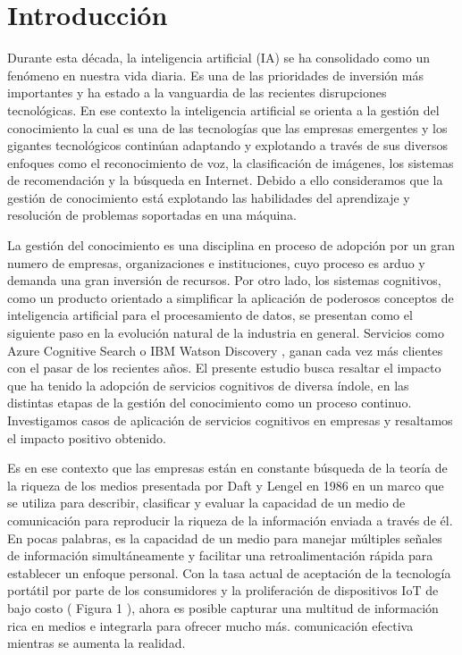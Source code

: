 \section{Introducción}

Durante esta década, la inteligencia artificial (IA) se ha consolidado como un fenómeno en nuestra vida diaria. Es una de las prioridades de inversión más importantes y ha estado a la vanguardia de las recientes disrupciones tecnológicas. En ese contexto la inteligencia artificial se orienta a la gestión del conocimiento la cual es una de las tecnologías que las empresas emergentes y los gigantes tecnológicos continúan adaptando y explotando a través de sus diversos enfoques como el reconocimiento de voz, la clasificación de imágenes, los sistemas de recomendación y la búsqueda en Internet. Debido a ello consideramos que la gestión de conocimiento está explotando las habilidades del aprendizaje y resolución de problemas soportadas en una máquina.

La gestión del conocimiento es una disciplina en proceso de adopción por un gran numero de empresas, organizaciones e instituciones, cuyo proceso es arduo y demanda una gran inversión de recursos. Por otro lado, los sistemas cognitivos, como un producto orientado a simplificar la aplicación de poderosos conceptos de inteligencia artificial para el procesamiento de datos, se presentan como el siguiente paso en la evolución natural de la industria en general. Servicios como Azure Cognitive Search o IBM Watson Discovery \cite{Tadejko2020}, ganan cada vez más clientes con el pasar de los recientes años. El presente estudio busca resaltar el impacto que ha tenido la adopción de servicios cognitivos de diversa índole, en las distintas etapas de la gestión del conocimiento como un proceso continuo. Investigamos casos de aplicación de servicios cognitivos en empresas y resaltamos el impacto positivo obtenido.

Es en ese contexto que las empresas están en constante búsqueda de la teoría de la riqueza de los medios presentada por Daft y Lengel en 1986 en un marco que se utiliza para describir, clasificar y evaluar la capacidad de un medio de comunicación para reproducir la riqueza de la información enviada a través de él.  En pocas palabras, es la capacidad de un medio para manejar múltiples señales de información simultáneamente y facilitar una retroalimentación rápida para establecer un enfoque personal.  Con la tasa actual de aceptación de la tecnología portátil por parte de los consumidores  y la proliferación de dispositivos IoT de bajo costo ( Figura 1 ), ahora es posible capturar una multitud de información rica en medios e integrarla para ofrecer mucho más. comunicación efectiva mientras se aumenta la realidad.

